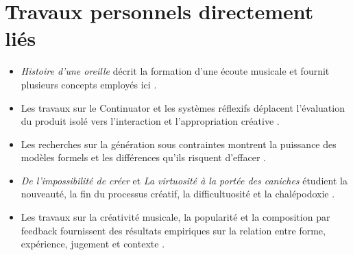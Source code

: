 \documentclass[11pt,a4paper]{article}
\begin{document}
\section{Travaux personnels directement liés}

\begin{itemize}
  \item \emph{Histoire d'une oreille} décrit la formation d'une écoute musicale
        et fournit plusieurs concepts employés ici \parencite{pachet2018oreille}.
  \item Les travaux sur le Continuator et les systèmes réflexifs déplacent
        l'évaluation du produit isolé vers l'interaction et l'appropriation
        créative \parencite{pachet2004flowmachines,pachet2008machines}.
  \item Les recherches sur la génération sous contraintes montrent la puissance
        des modèles formels et les différences qu'ils risquent d'effacer
        \parencite{pachet2026markov,pachet2026tonalparsimony}.
  \item \emph{De l'impossibilité de créer} et \emph{La virtuosité à la portée
        des caniches} étudient la nouveauté, la fin du processus créatif, la
        difficultuosité et la chalépodoxie
        \parencite{pachet2026impossibilite,pachet2027virtuosite}.
  \item Les travaux sur la créativité musicale, la popularité et la composition
        par feedback fournissent des résultats empiriques sur la relation entre
        forme, expérience, jugement et contexte
        \parencite{pachet2006creativity,pachetroy2008hitsong,martin2016creativeprocess}.
\end{itemize}

\printbibliography[keyword={francois-pachet},title={Travaux de François Pachet}]
\printbibliography[notkeyword={francois-pachet},title={Autres références}]
\end{document}
